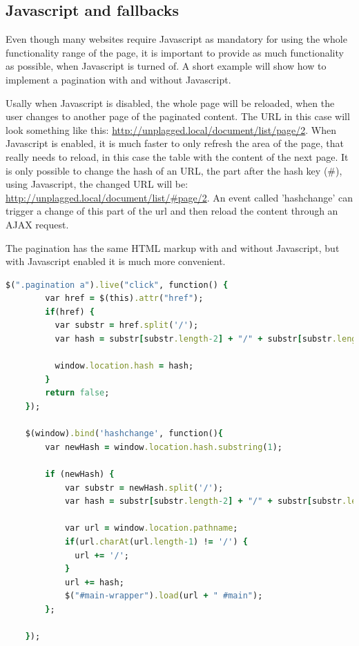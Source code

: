 \subsection{Javascript and fallbacks}
Even though many websites require Javascript as mandatory for using the whole functionality range of the page, it is important to provide as much functionality as possible, when Javascript is turned of. A short example will show how to implement a pagination with and without Javascript.

Usally when Javascript is disabled, the whole page will be reloaded, when the user changes to another page of the paginated content. The URL in this case will look something like this: \url{http://unplagged.local/document/list/page/2}. When Javascript is enabled, it is much faster to only refresh the area of the page, that really needs to reload, in this case the table with the content of the next page. It is only possible to change the hash of an URL, the part after the hash key (\#), using Javascript, the changed URL will be: \url{http://unplagged.local/document/list/#page/2}. An event called 'hashchange' can trigger a change of this part of the url and then reload the content through an AJAX request.

The pagination has the same HTML markup with and without Javascript, but with Javascript enabled it is much more convenient.

\begin{lstlisting}[caption=Javascript Pagination, label=list:cssMediaQuery, language=Ruby]
$(".pagination a").live("click", function() {
        var href = $(this).attr("href");
        if(href) {
          var substr = href.split('/');
          var hash = substr[substr.length-2] + "/" + substr[substr.length-1];

          window.location.hash = hash;
        }
        return false;
    });
    
    $(window).bind('hashchange', function(){
        var newHash = window.location.hash.substring(1);
        
        if (newHash) {
            var substr = newHash.split('/');
            var hash = substr[substr.length-2] + "/" + substr[substr.length-1];
            
            var url = window.location.pathname;
            if(url.charAt(url.length-1) != '/') {
              url += '/';
            }
            url += hash;
            $("#main-wrapper").load(url + " #main");
        };
        
    });
\end{lstlisting}


